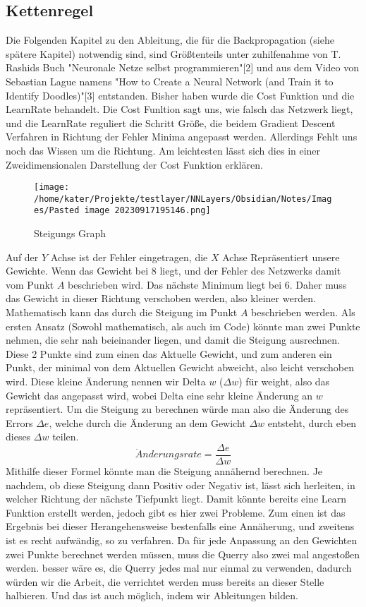 \documentclass[12pt]{article}
\begin{document}
\subsection{ Kettenregel}
Die Folgenden Kapitel zu den Ableitung, die für die Backpropagation (siehe spätere Kapitel) notwendig sind, sind Größtenteils unter zuhilfenahme von T. Rashids Buch "Neuronale Netze selbst programmieren"[2] und aus dem Video von Sebastian Lague namens "How to Create a Neural Network (and Train it to Identify Doodles)"[3] entstanden. 
Bisher haben wurde die Cost Funktion und die LearnRate behandelt. Die Cost Funltion sagt uns, wie falsch das Netzwerk liegt, und die LearnRate reguliert die Schritt Größe, die beidem Gradient Descent Verfahren in Richtung der Fehler Minima angepasst werden. Allerdings Fehlt uns noch das Wissen um die Richtung. 
Am leichtesten lässt sich dies in einer Zweidimensionalen Darstellung der Cost Funktion erklären.
\begin{figure}[H]
\centering
\texttt{[image: /home/kater/Projekte/testlayer/NNLayers/Obsidian/Notes/Images/Pasted image 20230917195146.png]}
\caption{Steigungs Graph}
\label{Was kommt hier rein?}
\end{figure}
Auf der $Y$ Achse ist der Fehler eingetragen, die $X$ Achse Repräsentiert unsere Gewichte. Wenn das Gewicht bei 8 liegt, und der Fehler des Netzwerks damit vom Punkt $A$ beschrieben wird. Das nächste Minimum liegt bei 6. Daher muss das Gewicht in dieser Richtung verschoben werden, also kleiner werden. 
Mathematisch kann das durch die Steigung im Punkt $A$ beschrieben werden. Als ersten Ansatz (Sowohl mathematisch, als auch im Code) könnte man zwei Punkte nehmen, die sehr nah beieinander liegen, und damit die Steigung ausrechnen. Diese 2 Punkte sind zum einen das Aktuelle Gewicht, und zum anderen ein Punkt, der minimal von dem Aktuellen Gewicht abweicht, also leicht verschoben wird.
Diese kleine Änderung nennen wir Delta $w$ ($\Delta w$) für weight, also das Gewicht das angepasst wird, wobei Delta eine sehr kleine Änderung an $w$ repräsentiert.
Um die Steigung zu berechnen würde man also die Änderung des Errors $\Delta e$, welche durch die Änderung an dem Gewicht $\Delta w$ entsteht, durch eben dieses $\Delta w$ teilen. $$\ddot{A}nderungsrate = \frac{\Delta e}{\Delta w}$$
Mithilfe dieser Formel könnte man die Steigung annähernd berechnen. Je nachdem, ob diese Steigung dann Positiv oder Negativ ist, lässt sich herleiten, in welcher Richtung der nächste Tiefpunkt liegt. Damit könnte bereits eine Learn Funktion erstellt werden, jedoch gibt es hier zwei Probleme.
Zum einen ist das Ergebnis bei dieser Herangehensweise bestenfalls eine Annäherung, und zweitens ist es recht aufwändig, so zu verfahren. Da für jede Anpassung an den Gewichten zwei Punkte berechnet werden müssen, muss die Querry also zwei mal angestoßen werden. besser wäre es, die Querry jedes mal nur einmal zu verwenden, dadurch würden wir die Arbeit, die verrichtet werden muss bereits an dieser Stelle halbieren. Und das ist auch möglich, indem wir Ableitungen bilden.
\end{document}
